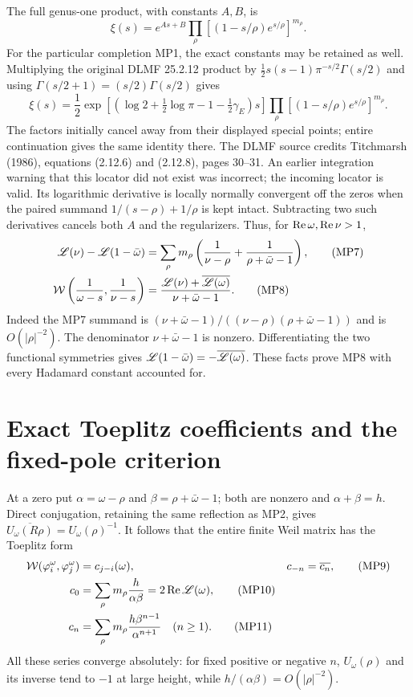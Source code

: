The full genus-one product, with constants $A,B$, is
\begin{equation}
 \xi(s)=e^{As+B}\prod_\rho
       \left[(1-s/\rho)e^{s/\rho}\right]^{m_\rho}.
 \tag{MP6}
\end{equation}
For the particular completion MP1, the exact constants may be retained
as well. Multiplying the original DLMF 25.2.12 product by
$\tfrac12s(s-1)\pi^{-s/2}\Gamma(s/2)$ and using
$\Gamma(s/2+1)=(s/2)\Gamma(s/2)$ gives
\begin{equation}
 \xi(s)=\frac12\exp\!\left[
  \left(\log2+\tfrac12\log\pi-1-\tfrac12\gamma_E\right)s\right]
 \prod_\rho\left[(1-s/\rho)e^{s/\rho}\right]^{m_\rho}.
 \tag{MP6a}
\end{equation}
The factors initially cancel away from their displayed special points;
entire continuation gives the same identity there. The DLMF source
credits Titchmarsh (1986), equations (2.12.6) and (2.12.8), pages 30--31.
An earlier integration warning that this locator did not exist was
incorrect; the incoming locator is valid.
Its logarithmic derivative is locally normally convergent off the zeros
when the paired summand $1/(s-\rho)+1/\rho$ is kept intact. Subtracting
two such derivatives cancels both $A$ and the regularizers. Thus, for
$\operatorname{Re}\omega,\operatorname{Re}\nu>1$,
\begin{align}
 \mathscr L(\nu)-\mathscr L(1-\bar\omega)
 &=\sum_\rho m_\rho
       \left(\frac1{\nu-\rho}+\frac1{\rho+\bar\omega-1}\right),\tag{MP7}\\
 \mathcal W\left(\frac1{\omega-s},\frac1{\nu-s}\right)
 &=\frac{\mathscr L(\nu)+\overline{\mathscr L(\omega)}}{\nu+\bar\omega-1}.
 \tag{MP8}
\end{align}
Indeed the MP7 summand is
$(\nu+\bar\omega-1)/((\nu-\rho)(\rho+\bar\omega-1))$ and is
$O(|\rho|^{-2})$. The denominator $\nu+\bar\omega-1$ is nonzero.
Differentiating the two functional symmetries gives
$\mathscr L(1-\bar\omega)=-\overline{\mathscr L(\omega)}$. These facts prove MP8
with every Hadamard constant accounted for.

\section{Exact Toeplitz coefficients and the fixed-pole criterion}
At a zero put $\alpha=\omega-\rho$ and $\beta=\rho+\bar\omega-1$;
both are nonzero and $\alpha+\beta=h$. Direct conjugation, retaining the
same reflection as MP2, gives
$\overline{U_\omega(R\rho)}=U_\omega(\rho)^{-1}$.
It follows that the entire finite Weil matrix has the Toeplitz form
\begin{align}
 \mathcal W(\varphi_i^\omega,\varphi_j^\omega)&=c_{j-i}(\omega),
   &c_{-n}&=\overline{c_n},\tag{MP9}\\
 c_0&=\sum_\rho m_\rho\frac h{\alpha\beta}
             =2\operatorname{Re}\mathscr L(\omega),\tag{MP10}\\
 c_n&=\sum_\rho m_\rho\frac{h\beta^{n-1}}{\alpha^{n+1}}
       \quad(n\geq1).\tag{MP11}
\end{align}
All these series converge absolutely: for fixed positive or negative
$n$, $U_\omega(\rho)$ and its inverse tend to $-1$ at large height,
while $h/(\alpha\beta)=O(|\rho|^{-2})$.

